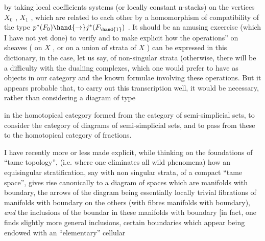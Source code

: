 

by taking local coefficients systems (or locally constant n-stacks) on
the vertices $X_0$ , $X_1$ , which are related to each other by a homomorphism
of compatibility of the type $p^*(F_0)\hand{\to} j^*(F_{\hand{1}})$ . It should be an amusing
excercise (which I have not yet done) to verify and to make explicit how
the   operations'' on sheaves ( on $X$ , or on a  union of strata of $X$ )
can be expressed in this dictionary, in the case, let us say, of non-singular
strata (otherwise, there will be a difficulty with the dualiing complexes,
which one would prefer to have as objects in our category\hand{)}\hand{,} and  
 the known formulae involving these operations\deleted{)}. But it appears
probable that, to carry out this transcription well, it would be necessary,
rather than considering a diagram of type

\diagram{\begin{tikzcd}
\bullet \arrow[r,color=blue] \arrow[d,color=blue] \& \bullet \\
\bullet \&
\end{tikzcd}}

in the homotopical category formed from the category of semi-simplicial sets,
to consider the category of diagrams of semi-simplicial sets, and to pass from
these to the homotopical category of fractions.

I have recently more or less made explicit, while thinking on the
foundations of ``tame topology'', (i.e. where one  eliminates  all
wild phenomena) how an equisingular stratification, say with non singular
strata, of a compact ``tame space'', gives rise canonically to a diagram of spaces
which are manifolds with boundary,  the arrows of the diagram being essentially
locally trivial fibrations of manifolds with boundary on the others (with
fibres  manifolds with boundary), \textit{and} the inclusions of the boundar in these
manifolds with boundary [in fact, one finds slightly more general inclusions,
certain boundaries which appear being endowed with an ``elementary'' cellular

